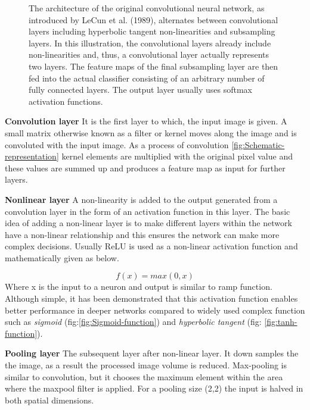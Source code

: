 \begin{figure}[h]
	\caption[Architecture of a traditional convolutional neural network.]{\protect\cite{davidstutz2016} The architecture of the original convolutional neural network, as introduced by LeCun et al. (1989), alternates between convolutional layers including hyperbolic tangent non-linearities and subsampling layers. In this illustration, the convolutional layers already include non-linearities and, thus, a convolutional layer actually represents two layers. The feature maps of the final subsampling layer are then fed into the actual classifier consisting of an arbitrary number of fully connected layers. The output layer usually uses softmax activation functions.}
	\label{fig:traditional-convolutional-network}
\end{figure}

\newpara \textbf{Convolution layer} It is the first layer to which, the input image is given. A small matrix otherwise known as a filter or kernel moves along the image and is convoluted with the input image. As a process of convolution \ref{fig:Schematic-representation} kernel elements are multiplied with the original pixel value and these values are summed up and produces a feature map as input for further layers.
 
\newpara \textbf{Nonlinear layer}
A non-linearity is added to the output generated from a convolution layer in the form of an activation function in this layer. The basic idea of adding a non-linear layer is to make different layers within the network have a non-linear relationship and this ensures the network can make more complex decisions.
Usually ReLU is used as a non-linear activation function and mathematically given as below.

\begin{equation}
	f(x) =max(0, x)
\end {equation}
Where x is the input to a neuron and output is similar to ramp function.
Although simple, it has been demonstrated that this activation function enables better performance in deeper networks compared to widely used complex function such as \textit{sigmoid} (fig:\ref{fig:Sigmoid-function}) and \textit{hyperbolic tangent} (fig: \ref{fig:tanh-function}).

\newpara \textbf{Pooling layer}
The subsequent layer after non-linear layer. It down samples the the image, as a result the processed image volume is reduced. Max-pooling is similar to convolution, but it chooses the maximum element within the area where the maxpool filter is applied. For a pooling size (2,2) the input is halved in both spatial dimensions.

